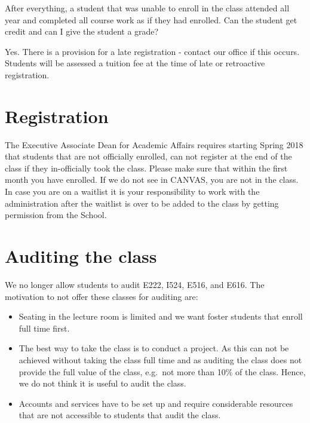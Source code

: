 After everything, a student that was unable to enroll in the class
attended all year and completed all course work as if they had enrolled.
Can the student get credit and can I give the student a grade?

Yes. There is a provision for a late registration - contact our office
if this occurs. Students will be assessed a tuition fee at the time of
late or retroactive registration.

\section{Registration}\label{S:register-mandatory}

The Executive Associate Dean for Academic Affairs requires starting
Spring 2018 that students that are not officially enrolled, can not
register at the end of the class if they in-officially took the class.
Please make sure that within the first month you have enrolled. If we
do not see in CANVAS, you are not in the class. In case you are on a
waitlist it is your responsibility to work with the administration
after the waitlist is over to be added to the class by getting
permission from the School. 

\section{Auditing the class}\label{auditing-the-class}

We no longer allow students to audit E222, I524, E516, and E616. The
motivation to not offer these classes for auditing are:

\begin{itemize}
\item Seating in the lecture room is limited and we want foster
  students that enroll full time first.

\item The best way to take the class is to conduct a project. As this
  can not be achieved without taking the class full time and as
  auditing the class does not provide the full value of the class,
  e.g.\ not more than 10\% of the class. Hence, we do not think it is
  useful to audit the class.

\item  Accounts and services have to be set up and require
  considerable resources that are not accessible to students that
  audit the class.

\end{itemize}


